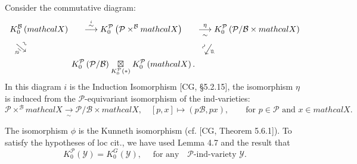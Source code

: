 \documentclass[10pt,a4paper]{amsart}
\def\B{\mathcal{B}}
\def\P{\mathcal{P}}
\def\Y{\mathcal{Y}}
\def\ref#1{#1}
\newcommand{\X}{mathcal{X}}
\begin{document}
\begin{definition}\label{4.8} \rm{
Consider the commutative diagram:
$$
\arraycolsep=2pt
\begin{array}{lcl}
\displaystyle K_0^\B\left(\X\right)&\displaystyle \overset{\overset{i}{\sim}}{\longrightarrow} K_0^\P \left(\P \times^\B \X\right) &\displaystyle \underset{\sim}{\overset{\eta}{\longrightarrow}} K_0^{\P} \left(\P/\B \times \X\right)\\
\rotatebox[origin=c]{140}{$\underset{\sim}{\overset{\underline{\phi}}{\longleftarrow}}$} 
&& \rotatebox[origin=c]{240}{$\underset{\sim}{\overset{{\phi}}{\longrightarrow}}$}  
\\
&\displaystyle  K_0^\P \left(\P/\B\right)  \underset{K_0^\P(*)}{\boxtimes} K_0^\P\left(\X\right).&
\end{array}
$$
In this diagram $i$ is the Induction Isomorphism [CG, \S5.2.15], the isomorphism $\eta$ is induced from the $\P$-equivariant isomorphism of the ind-varieties:
$$
\P \times^{\B} \X \underset{\sim}{\rightarrow} \P/\B \times  \X, \quad \left[ p,x\right] \mapsto\left(p\B,px\right),
\qquad \mbox{for } p\in \P \mbox{ and } x\in \X.
$$

The isomorphism $\phi$ is the Kunneth isomorphism (cf. [CG, Theorem 5.6.1]). To satisfy the hypotheses of loc cit., we have used Lemma \ref{4.7} and the result that 
$$ 
K_0^\P \left(\Y\right) =K_0^G \left(\Y\right),\quad\mbox{ for any } \mbox{ $\P$-ind-variety }\Y. 
$$

}
\end{definition}
\end{document}
